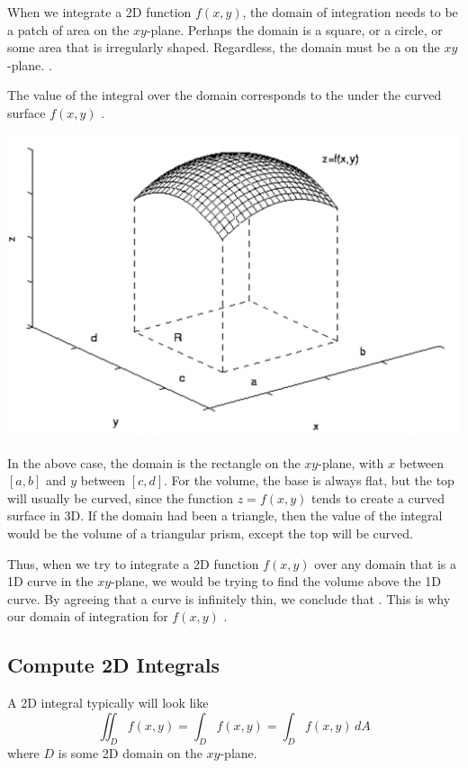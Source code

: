 \documentclass[11pt,fleqn]{book} %
\begin{document}
When we integrate a 2D function $f(x, y)$, the domain of integration needs to be a patch of area on the $xy$-plane. Perhaps the domain is a square, or a circle, or some area that is irregularly shaped. Regardless, the domain must be a  on the $xy$-plane. .

The value of the integral over the domain corresponds to the  under the curved surface $f(x, y)$ .

\begin{center} \includegraphics[width=0.75\linewidth]{Plots/s_4_1/Integral.png} \end{center}

In the above case, the domain is the rectangle on the $xy$-plane, with $x$ between $[a, b]$ and $y$ between $[c, d]$. For the volume, the base is always flat, but the top will usually be curved, since the function $z = f(x, y)$ tends to create a curved surface in 3D. If the domain had been a triangle, then the value of the integral would be the volume of a triangular prism, except the top will be curved.

Thus, when we try to integrate a 2D function $f(x, y)$ over any domain that is a 1D curve in the $xy$-plane, we would be trying to find the volume above the 1D curve. By agreeing that a curve is infinitely thin, we conclude that . This is why our domain of integration for $f(x, y)$ .

\subsection*{Compute 2D Integrals}

A 2D integral typically will look like $$\iint_D f(x,y) = \int_D f(x, y) = \int_D f(x,y) \,dA$$ where $D$ is some 2D domain on the $xy$-plane.
\end{document}
